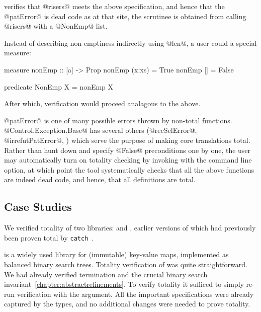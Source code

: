 \toolname verifies that @risers@ meets the above specification, 
and hence that the @patError@ is dead code as at that 
site, the scrutinee is obtained from calling @risers@ with a
@NonEmp@ list.

Instead of describing non-emptiness indirectly using @len@, a 
user could a special measure:
%
\begin{code}
  measure nonEmp  :: [a] -> Prop
  nonEmp (x:xs)   = True
  nonEmp []       = False

  predicate NonEmp X = nonEmp X
\end{code}
%
After which, verification would proceed analagous to the above.

@patError@ is one of many possible errors thrown by non-total functions.  
@Control.Exception.Base@ has several others (@recSelError@, @irrefutPatError@, \etc) which serve the purpose of making 
core translations total.
%
Rather than hunt down and specify @False@ preconditions one
by one, the user may automatically turn on totality checking 
by invoking \toolname with the \cmdtotality command line option, 
at which point the tool systematically checks that all the above 
functions are indeed dead code, and hence, that all definitions are total.

\subsection{Case Studies}

We verified totality of two libraries: \lbhscolour and \lbmap, earlier versions
of which had previously been proven total by \texttt{catch}~\citep{catch}.

\mypara{\lbmap} 
is a widely used library for (immutable) key-value maps, implemented
as balanced binary search trees.
Totality verification of \lbmap was quite straightforward.
We had already verified termination and the crucial 
binary search invariant~\ref{chapter:abstractrefinements}. To verify 
totality it sufficed to simply re-run verification with
the \cmdtotality argument.
%
All the important specifications were already captured by the types, 
and no additional changes were needed to prove totality.
%
%

